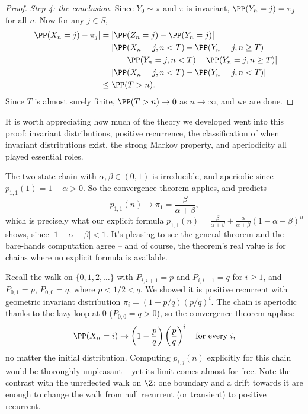 \begin{proof}
	\emph{Step 4: the conclusion.} Since $Y_0 \sim \pi$ and $\pi$ is invariant, $\PP(Y_n = j) = \pi_j$ for all $n$. Now for any $j \in S$,
	\begin{align*}
		|\PP(X_n = j) - \pi_j| &= |\PP(Z_n = j) - \PP(Y_n = j)| \\
		&= |\PP(X_n = j, n < T) + \PP(Y_n = j, n \geq T) \\
		&\qquad - \PP(Y_n = j, n < T) - \PP(Y_n = j, n \geq T)| \\
		&= |\PP(X_n = j, n < T) - \PP(Y_n = j, n < T)| \\
		&\leq \PP(T > n).
	\end{align*}
	Since $T$ is almost surely finite, $\PP(T > n) \rightarrow 0$ as $n \rightarrow \infty$, and we are done.
\end{proof}

It is worth appreciating how much of the theory we developed went into this proof: invariant distributions, positive recurrence, the classification of when invariant distributions exist, the strong Markov property, and aperiodicity all played essential roles.

\begin{example}
	The two-state chain with $\alpha, \beta \in (0, 1)$ is irreducible, and aperiodic since $p_{1, 1}(1) = 1 - \alpha > 0$. So the convergence theorem applies, and predicts
	$$
	p_{1, 1}(n) \rightarrow \pi_1 = \frac{\beta}{\alpha + \beta},
	$$
	which is precisely what our explicit formula
	$
	p_{1, 1}(n) = \frac{\beta}{\alpha + \beta} + \frac{\alpha}{\alpha + \beta}(1 - \alpha - \beta)^n
	$
	shows, since $|1 - \alpha - \beta| < 1$. It's pleasing to see the general theorem and the bare-hands computation agree -- and of course, the theorem's real value is for chains where no explicit formula is available.
\end{example}

\begin{example}
	Recall the walk on $\{0, 1, 2, \dots\}$ with $P_{i, i + 1} = p$ and $P_{i, i - 1} = q$ for $i \geq 1$, and $P_{0, 1} = p$, $P_{0, 0} = q$, where $p < 1/2 < q$. We showed it is positive recurrent with geometric invariant distribution $\pi_i = (1 - p/q)(p/q)^i$. The chain is aperiodic thanks to the lazy loop at 0 ($P_{0,0} = q > 0$), so the convergence theorem applies:
	$$
	\PP(X_n = i) \rightarrow \left(1 - \frac{p}{q}\right)\left(\frac{p}{q}\right)^i \quad \text{for every } i,
	$$
	no matter the initial distribution. Computing $p_{i, j}(n)$ explicitly for this chain would be thoroughly unpleasant -- yet its limit comes almost for free. Note the contrast with the unreflected walk on $\Z$: one boundary and a drift towards it are enough to change the walk from null recurrent (or transient) to positive recurrent.
\end{example}

